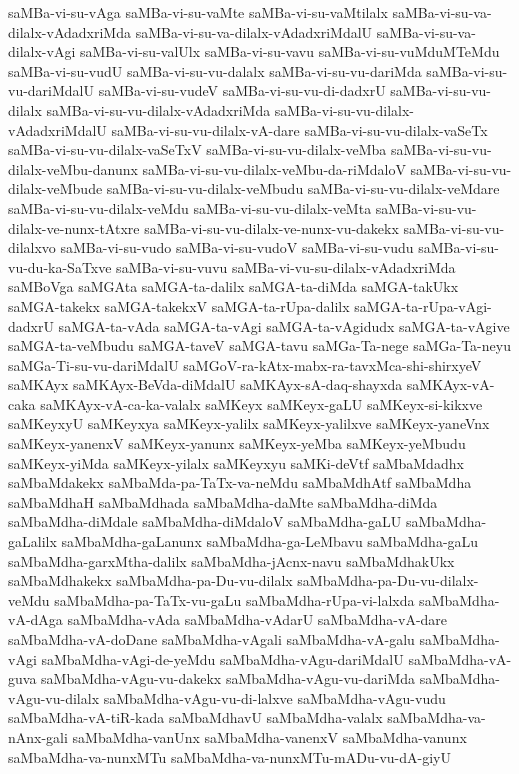 {saMBa-vi-su-vAga
saMBa-vi-su-vaMte
saMBa-vi-su-vaMtilalx
saMBa-vi-su-va-dilalx-vAdadxriMda
saMBa-vi-su-va-dilalx-vAdadxriMdalU
saMBa-vi-su-va-dilalx-vAgi
saMBa-vi-su-valUlx
saMBa-vi-su-vavu
saMBa-vi-su-vuMduMTeMdu
saMBa-vi-su-vudU
saMBa-vi-su-vu-dalalx
saMBa-vi-su-vu-dariMda
saMBa-vi-su-vu-dariMdalU
saMBa-vi-su-vudeV
saMBa-vi-su-vu-di-dadxrU
saMBa-vi-su-vu-dilalx
saMBa-vi-su-vu-dilalx-vAdadxriMda
saMBa-vi-su-vu-dilalx-vAdadxriMdalU
saMBa-vi-su-vu-dilalx-vA-dare
saMBa-vi-su-vu-dilalx-vaSeTx
saMBa-vi-su-vu-dilalx-vaSeTxV
saMBa-vi-su-vu-dilalx-veMba
saMBa-vi-su-vu-dilalx-veMbu-danunx
saMBa-vi-su-vu-dilalx-veMbu-da-riMdaloV
saMBa-vi-su-vu-dilalx-veMbude
saMBa-vi-su-vu-dilalx-veMbudu
saMBa-vi-su-vu-dilalx-veMdare
saMBa-vi-su-vu-dilalx-veMdu
saMBa-vi-su-vu-dilalx-veMta
saMBa-vi-su-vu-dilalx-ve-nunx-tAtxre
saMBa-vi-su-vu-dilalx-ve-nunx-vu-dakekx
saMBa-vi-su-vu-dilalxvo
saMBa-vi-su-vudo
saMBa-vi-su-vudoV
saMBa-vi-su-vudu
saMBa-vi-su-vu-du-ka-SaTxve
saMBa-vi-su-vuvu
saMBa-vi-vu-su-dilalx-vAdadxriMda
saMBoVga
saMGAta
saMGA-ta-dalilx
saMGA-ta-diMda
saMGA-takUkx
saMGA-takekx
saMGA-takekxV
saMGA-ta-rUpa-dalilx
saMGA-ta-rUpa-vAgi-dadxrU
saMGA-ta-vAda
saMGA-ta-vAgi
saMGA-ta-vAgidudx
saMGA-ta-vAgive
saMGA-ta-veMbudu
saMGA-taveV
saMGA-tavu
saMGa-Ta-nege
saMGa-Ta-neyu
saMGa-Ti-su-vu-dariMdalU
saMGoV-ra-kAtx-mabx-ra-tavxMca-shi-shirxyeV
saMKAyx
saMKAyx-BeVda-diMdalU
saMKAyx-sA-daq-shayxda
saMKAyx-vA-caka
saMKAyx-vA-ca-ka-valalx
saMKeyx
saMKeyx-gaLU
saMKeyx-si-kikxve
saMKeyxyU
saMKeyxya
saMKeyx-yalilx
saMKeyx-yalilxve
saMKeyx-yaneVnx
saMKeyx-yanenxV
saMKeyx-yanunx
saMKeyx-yeMba
saMKeyx-yeMbudu
saMKeyx-yiMda
saMKeyx-yilalx
saMKeyxyu
saMKi-deVtf
saMbaMdadhx
saMbaMdakekx
saMbaMda-pa-TaTx-va-neMdu
saMbaMdhAtf
saMbaMdha
saMbaMdhaH
saMbaMdhada
saMbaMdha-daMte
saMbaMdha-diMda
saMbaMdha-diMdale
saMbaMdha-diMdaloV
saMbaMdha-gaLU
saMbaMdha-gaLalilx
saMbaMdha-gaLanunx
saMbaMdha-ga-LeMbavu
saMbaMdha-gaLu
saMbaMdha-garxMtha-dalilx
saMbaMdha-jAcnx-navu
saMbaMdhakUkx
saMbaMdhakekx
saMbaMdha-pa-Du-vu-dilalx
saMbaMdha-pa-Du-vu-dilalx-veMdu
saMbaMdha-pa-TaTx-vu-gaLu
saMbaMdha-rUpa-vi-lalxda
saMbaMdha-vA-dAga
saMbaMdha-vAda
saMbaMdha-vAdarU
saMbaMdha-vA-dare
saMbaMdha-vA-doDane
saMbaMdha-vAgali
saMbaMdha-vA-galu
saMbaMdha-vAgi
saMbaMdha-vAgi-de-yeMdu
saMbaMdha-vAgu-dariMdalU
saMbaMdha-vA-guva
saMbaMdha-vAgu-vu-dakekx
saMbaMdha-vAgu-vu-dariMda
saMbaMdha-vAgu-vu-dilalx
saMbaMdha-vAgu-vu-di-lalxve
saMbaMdha-vAgu-vudu
saMbaMdha-vA-tiR-kada
saMbaMdhavU
saMbaMdha-valalx
saMbaMdha-va-nAnx-gali
saMbaMdha-vanUnx
saMbaMdha-vanenxV
saMbaMdha-vanunx
saMbaMdha-va-nunxMTu
saMbaMdha-va-nunxMTu-mADu-vu-dA-giyU
}
